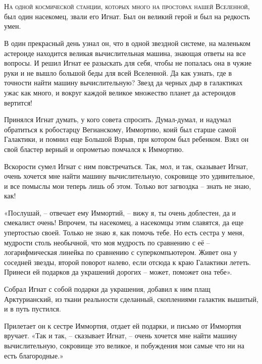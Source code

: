 \documentclass[ebook,oneside,final,openright]{memoir}
\begin{document}
\chapter{}
 \lettrine{Н}{а одной космической станции, которых много на просторах нашей Вселенной,} был один насекомец, звали его Игнат. Был он великий герой и был на редкость умен.\par
\par
В один прекрасный день узнал он, что в одной звездной системе, на маленьком астероиде находится великая вычислительная машина, знающая ответы на все вопросы. И решил Игнат ее разыскать для себя, чтобы не попалась она в чужие руки и не вышло большой беды для всей Вселенной. Да как узнать, где в точности найти машину вычислительную? Звезд да черных дыр в галактиках ужас как много, и вокруг каждой великое множество планет да астероидов вертится!\par
\par
Принялся Игнат думать, у кого совета спросить. Думал-думал, и надумал обратиться к робостарцу Вегианскому, Иммортию, коий был старше самой Галактики, и помнил еще Большой Взрыв, при котором был ребенком. Взял он свой бластер верный и опрометью помчался к Иммортию.\par
\par
Вскорости сумел Игнат с ним повстречаться. Так, мол, и так, сказывает Игнат, очень хочется мне найти машину вычислительную, сокровище это удивительное, и все помыслы мои теперь лишь об этом. Только вот загвоздка – знать не знаю, как!\par
\par
«Послушай, – отвечает ему Иммортий, – вижу я, ты очень доблестен, да и смекалист очень! Впрочем, ты насекомец, а насекомцы этим славятся, да еще упертостью своей. Только не знаю я, как помочь тебе. Но есть сестра у меня, мудрости столь необычной, что моя мудрость по сравнению с её – логарифмическая линейка по сравнению с суперкомпьютером. Живет она у соседней звезды, второй поворот налево, если отсюда к краю Галактики лететь. Принеси ей подарков да украшений дорогих – может, поможет она тебе».\par
\par
Собрал Игнат с собой подарки да украшения, добавил к ним плащ Арктурианский, из ткани реальности сделанный, скоплениями галактик вышитый, и в путь пустился.\par
\par
Прилетает он к сестре Иммортия, отдает ей подарки, и письмо от Иммортия вручает. «Так и так, – сказывает Игнат, – очень хочется мне найти машину вычислительную, сокровище это великое, и побуждения мои самые что ни на есть благородные.»\par
\end{document}
